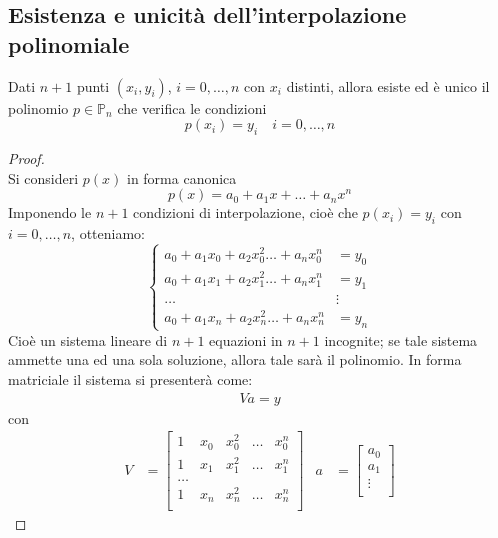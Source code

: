 \documentclass{article}
\begin{document}
\subsection{Esistenza e unicità dell'interpolazione polinomiale}
\begin{theorem}
    Dati $n+1$ punti $(x_i,y_i)$, $i=0,\ldots,n$ con $x_i$ distinti, allora
    esiste ed è unico il polinomio $p\in \mathbb{P}_n$ che verifica le
    condizioni
    $$p(x_i)=y_i\quad i=0,\ldots,n$$
\end{theorem}
\begin{proof}\leavevmode\\
    Si consideri $p(x)$ in forma canonica 
    $$p(x)=a_0+a_1x+\ldots+a_nx^n$$
    Imponendo le $n+1$ condizioni di interpolazione, cioè che
    $p(x_i)=y_i$ con $i=0,\ldots,n$, otteniamo:
    $$\begin{cases}
        a_0+a_1x_0+a_2x_{0}^2\ldots+a_nx_0^n&=y_0\\ 
        a_0+a_1x_1+a_2x_{1}^2\ldots+a_nx_1^n&=y_1\\ 
        \ldots & \vdots \\
        a_0+a_1x_n+a_2x_{n}^2\ldots+a_nx_n^n&=y_n
    \end{cases}$$
    Cioè un sistema lineare di $n+1$ equazioni in $n+1$ incognite; se tale
    sistema ammette una ed una sola soluzione, allora tale sarà il polinomio.
    In forma matriciale il sistema si presenterà come:
    \begin{equation}
       \begin{aligned}
           Va=y
       \end{aligned}
    \end{equation}
    con 
    \begin{equation*}
       \begin{aligned}
           V&=\begin{bmatrix}
               1 & x_0 & x_{0}^2 & \ldots & x_{0}^n \\ 
               1 & x_1 & x_{1}^2 & \ldots & x_{1}^n \\ 
               \ldots \\
               1 & x_n & x_{n}^2 & \ldots & x_{n}^n \\ 
           \end{bmatrix} &
            a&=\begin{bmatrix}
               a_0 \\ 
               a_1 \\ 
               \vdots \\ 

\end{bmatrix}
\end{aligned}
\end{equation*}
\end{proof}
\end{document}
